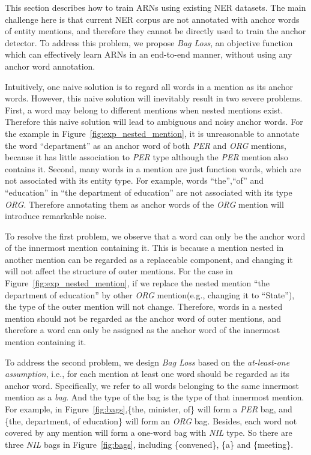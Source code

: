 \documentclass[11pt,a4paper]{article}
\begin{document}
This section describes how to train ARNs using existing NER datasets. The main challenge here is that current NER corpus are not annotated with anchor words of entity mentions, and therefore they cannot be directly used to train the anchor detector. To address this problem, we propose \emph{Bag Loss}, an objective function which can effectively learn ARNs in an end-to-end manner, without using any anchor word annotation.

Intuitively, one naive solution is to regard all words in a mention as its anchor words. However, this naive solution will inevitably result in two severe problems. First, a word may belong to different mentions when nested mentions exist. Therefore this naive solution will lead to ambiguous and noisy anchor words. For the example in Figure~\ref{fig:exp_nested_mention}, it is unreasonable to annotate the word ``department'' as an anchor word of both \emph{PER} and \emph{ORG} mentions, because it has little association to \emph{PER} type although the \emph{PER} mention also contains it. Second, many words in a mention are just function words, which are not associated with its entity type. For example, words ``the'',``of'' and ``education'' in ``the department of education'' are not associated with its type \emph{ORG}. Therefore annotating them as anchor words of the \emph{ORG} mention will introduce remarkable noise.

To resolve the first problem, we observe that a word can only be the anchor word of the innermost mention containing it. This is because a mention nested in another mention can be regarded as a replaceable component, and changing it will not affect the structure of outer mentions. For the case in Figure~\ref{fig:exp_nested_mention}, if we replace the nested mention ``the department of education'' by other \emph{ORG} mention(e.g., changing it to ``State''), the type of the outer mention will not change. Therefore, words in a nested mention should not be regarded as the anchor word of outer mentions, and therefore a word can only be assigned as the anchor word of the innermost mention containing it.

To address the second problem, we design \emph{Bag Loss} based on the \emph{at-least-one assumption}, i.e., for each mention at least one word should be regarded as its anchor word. Specifically, we refer to all words belonging to the same innermost mention as a \emph{bag}. And the type of the bag is the type of that innermost mention.
For example, in Figure~\ref{fig:bags},\{the, minister, of\} will form a \emph{PER} bag, and \{the, department, of education\} will form an \emph{ORG} bag. Besides, each word not covered by any mention will form a one-word bag with \emph{NIL} type. So there are three \emph{NIL} bags in Figure~\ref{fig:bags}, including \{convened\}, \{a\} and \{meeting\}.
\end{document}
